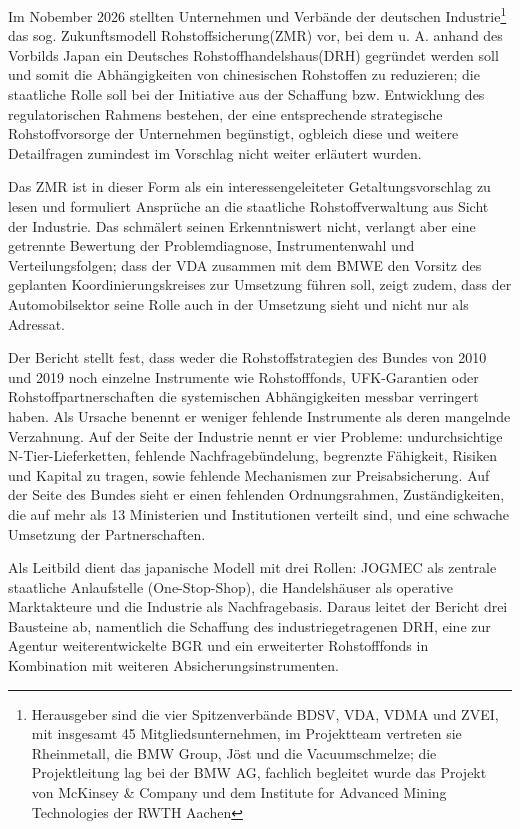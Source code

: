\documentclass[12pt,a4paper,oneside]{book} %
\begin{document}
{Im Nobember 2026 stellten Unternehmen und Verbände der deutschen Industrie\footnote{Herausgeber sind die vier Spitzenverbände BDSV, VDA, VDMA und ZVEI, mit insgesamt 45 Mitgliedsunternehmen, im Projektteam vertreten sie Rheinmetall, die BMW Group, Jöst und die Vacuumschmelze; die Projektleitung lag bei der BMW AG, fachlich begleitet wurde das Projekt von McKinsey & Company und dem Institute for Advanced Mining Technologies der RWTH Aachen} das sog. \glqq Zukunftsmodell Rohstoffsicherung\grqq (ZMR) vor, bei dem u. A. anhand des Vorbilds Japan ein \glqq Deutsches Rohstoffhandelshaus\grqq (DRH) gegründet werden soll und somit die Abhängigkeiten von chinesischen Rohstoffen zu reduzieren; die staatliche Rolle soll bei der Initiative aus der Schaffung bzw. Entwicklung des regulatorischen Rahmens bestehen, der eine entsprechende strategische Rohstoffvorsorge der Unternehmen begünstigt, ogbleich diese und weitere Detailfragen zumindest im Vorschlag nicht weiter erläutert wurden.\autocite[Siehe hierzu auch]{Handelsblatt: BMW und Rheinmetall planen Handelshaus für Rohstoffe, Handelsblatt Heft 227/2026 vom 24.11.2026, S. 10}

Das ZMR ist in dieser Form als ein interessengeleiteter Getaltungsvorschlag zu lesen und formuliert Ansprüche an die staatliche Rohstoffverwaltung aus Sicht der Industrie. Das schmälert seinen Erkenntniswert nicht, verlangt aber eine getrennte Bewertung der Problemdiagnose, Instrumentenwahl und Verteilungsfolgen; dass der VDA zusammen mit dem BMWE den Vorsitz des geplanten Koordinierungskreises zur Umsetzung führen soll, zeigt zudem, dass der Automobilsektor seine Rolle auch in der Umsetzung sieht und nicht nur als Adressat.

Der Bericht stellt fest, dass weder die Rohstoffstrategien des Bundes von 2010 und 2019 noch einzelne Instrumente wie Rohstofffonds, UFK-Garantien oder Rohstoffpartnerschaften die systemischen Abhängigkeiten messbar verringert haben. Als Ursache benennt er weniger fehlende Instrumente als deren mangelnde Verzahnung. Auf der Seite der Industrie nennt er vier Probleme: undurchsichtige N-Tier-Lieferketten, fehlende Nachfragebündelung, begrenzte Fähigkeit, Risiken und Kapital zu tragen, sowie fehlende Mechanismen zur Preisabsicherung. Auf der Seite des Bundes sieht er einen fehlenden Ordnungsrahmen, Zuständigkeiten, die auf mehr als 13 Ministerien und Institutionen verteilt sind, und eine schwache Umsetzung der Partnerschaften.

Als Leitbild dient das japanische Modell mit drei Rollen: JOGMEC als zentrale staatliche Anlaufstelle (One-Stop-Shop), die Handelshäuser als operative Marktakteure und die Industrie als Nachfragebasis. Daraus leitet der Bericht drei Bausteine ab, namentlich die Schaffung des industriegetragenen DRH, eine zur Agentur weiterentwickelte BGR und ein erweiterter Rohstofffonds in Kombination mit weiteren Absicherungsinstrumenten.

}
\end{document}
